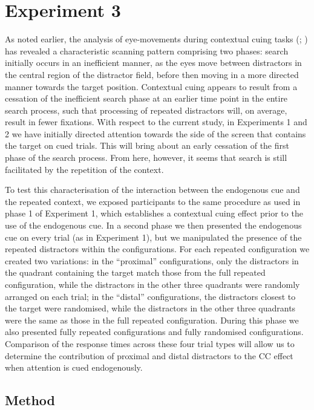 \documentclass[
  man,
  floatsintext,
  longtable,
  nolmodern,
  notxfonts,
  notimes,
  colorlinks=true,linkcolor=blue,citecolor=blue,urlcolor=blue]{apa7}
\begin{document}
\section{Experiment 3}\label{experiment-3}

As noted earlier, the analysis of eye-movements during contextual cuing
tasks (;
) has revealed a
characteristic scanning pattern comprising two phases: search initially
occurs in an inefficient manner, as the eyes move between distractors in
the central region of the distractor field, before then moving in a more
directed manner towards the target position. Contextual cuing appears to
result from a cessation of the inefficient search phase at an earlier
time point in the entire search process, such that processing of
repeated distractors will, on average, result in fewer fixations. With
respect to the current study, in Experiments 1 and 2 we have initially
directed attention towards the side of the screen that contains the
target on cued trials. This will bring about an early cessation of the
first phase of the search process. From here, however, it seems that
search is still facilitated by the repetition of the context.

To test this characterisation of the interaction between the endogenous
cue and the repeated context, we exposed participants to the same
procedure as used in phase 1 of Experiment 1, which establishes a
contextual cuing effect prior to the use of the endogenous cue. In a
second phase we then presented the endogenous cue on every trial (as in
Experiment 1), but we manipulated the presence of the repeated
distractors within the configurations. For each repeated configuration
we created two variations: in the ``proximal'' configurations, only the
distractors in the quadrant containing the target match those from the
full repeated configuration, while the distractors in the other three
quadrants were randomly arranged on each trial; in the ``distal''
configurations, the distractors closest to the target were randomised,
while the distractors in the other three quadrants were the same as
those in the full repeated configuration. During this phase we also
presented fully repeated configurations and fully randomised
configurations. Comparison of the response times across these four trial
types will allow us to determine the contribution of proximal and distal
distractors to the CC effect when attention is cued endogenously.

\subsection{Method}\label{method-2}
\end{document}

